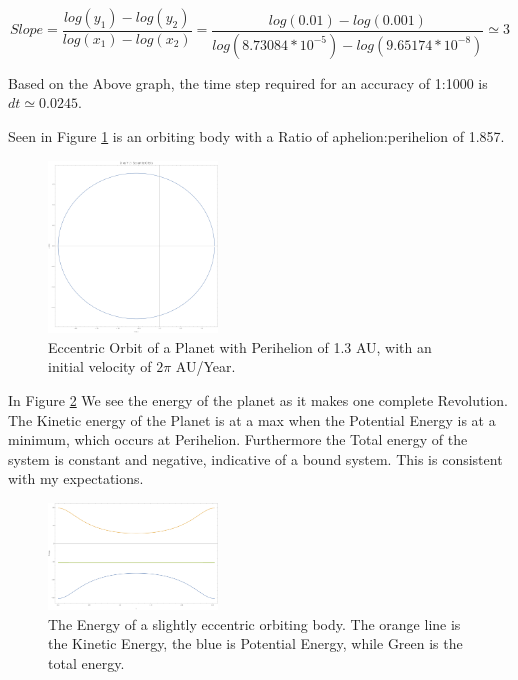 \documentclass{article}
\begin{document}
\begin{equation}\label{eq:3}
	Slope = \frac{log(y_1)-log(y_2)}{log(x_1)-log(x_2)}=\frac{log(0.01)-log(0.001)}{log(8.73084*10^{-5})-log(9.65174*10^{-8})} \simeq 3
\end{equation}

Based on the Above graph, the time step required for an accuracy of 1:1000 is $dt \simeq 0.0245$.

\pagebreak
\bigskip
{}
\medskip

Seen in Figure \ref{fig:eccen} is an orbiting body with a Ratio of aphelion:perihelion of 1.857.

\begin{figure}[h]
	\begin{center}
		\includegraphics[width=0.4\textwidth]{eccen.pdf}
	\end{center}
	\caption{Eccentric Orbit of a Planet with Perihelion of 1.3 AU, with an initial velocity of $2\pi$ AU/Year.}
	\label{fig:eccen}
\end{figure}

In Figure \ref{fig:energy} We see the energy of the planet as it makes one complete Revolution. The Kinetic energy of the Planet is at a max when the Potential Energy is at a minimum, which occurs at Perihelion. Furthermore the Total energy of the system is constant and negative, indicative of a bound system. This is consistent with my expectations.

\begin{figure}[h]
	\begin{center}
		\includegraphics[width=0.4\textwidth]{energy.pdf}
	\end{center}
	\caption{The Energy of a slightly eccentric orbiting body. The orange line is the Kinetic Energy, the blue is Potential Energy, while Green is the total energy.}
\label{fig:energy}
\end{figure}
\end{document}
